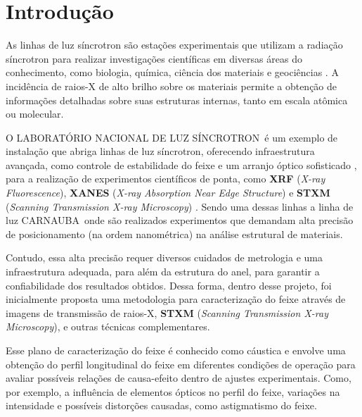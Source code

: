 \documentclass[12pt,a4paper]{article}
\makeatletter
\newcommand{\Lnls}{LABORATÓRIO NACIONAL DE LUZ SÍNCROTRON}
\newcommand{\CNB}{CARNAUBA}
\newcommand{\rotulosecao}[2]{%
    \phantomsection
    \def\@currentlabelname{#2}%
    \label{#1}%
}
\makeatother
\begin{document}
\pagestyle{fancy}
\tableofcontents
\newpage

\fontsize{11}{16.5}\selectfont %

\section*{Introdução}
\rotulosecao{sec:introducao}{Introdução}

As linhas de luz síncrotron são estações experimentais que utilizam a radiação síncrotron para realizar investigações científicas em diversas áreas do conhecimento, como biologia, química, ciência dos materiais e geociências \cite{xiao_chao_1}. 
A incidência de raios-X de alto brilho sobre os materiais permite a obtenção de informações detalhadas sobre suas estruturas internas, tanto em escala atômica ou molecular.

O \Lnls\ é um exemplo de instalação que abriga linhas de luz síncrotron, oferecendo infraestrutura avançada, como controle de estabilidade do feixe e um arranjo óptico sofisticado \cite{liu_lin_1}, para a realização de experimentos científicos de ponta, como \textbf{XRF} (\textit{X-ray Fluorescence}), \textbf{XANES} (\textit{X-ray Absorption Near Edge Structure}) e \textbf{STXM} (\textit{Scanning Transmission X-ray Microscopy}) \cite{lnlslinhas}.
Sendo uma dessas linhas a linha de luz \CNB\, onde são realizados experimentos que demandam alta precisão de posicionamento (na ordem nanométrica) na análise estrutural de materiais. 

Contudo, essa alta precisão requer diversos cuidados de metrologia e uma infraestrutura adequada, para além da estrutura do anel, para garantir a confiabilidade dos resultados obtidos. 
Dessa forma, dentro desse projeto, foi inicialmente proposta uma metodologia para caracterização do feixe através de imagens de transmissão de raios-X, \textbf{STXM} (\textit{Scanning Transmission X-ray Microscopy}), e outras técnicas complementares.


Esse plano de caracterização do feixe é conhecido como cáustica e envolve uma obtenção do perfil longitudinal do feixe em diferentes condições de operação para avaliar possíveis relações de causa-efeito dentro de ajustes experimentais.
Como, por exemplo, a influência de elementos ópticos no perfil do feixe, variações na intensidade e possíveis distorções causadas, como astigmatismo do feixe. 
\end{document}

